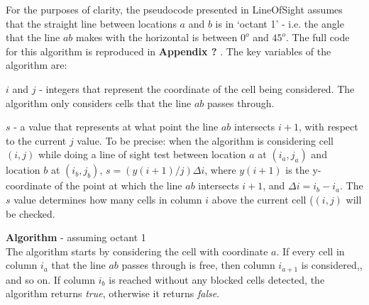 \documentclass[12pt,notitlepage]{report}
\begin{document}
\noindent
For the purposes of clarity, the pseudocode presented in {\sc LineOfSight} assumes that the straight line between locations $a$ and $b$ is in `octant 1' - i.e. the angle that the line $ab$ makes with the horizontal is between $0^{o}$ and $45^{o}$.
The full code for this algorithm is reproduced in {\bfseries Appendix ?} . The key variables of the algorithm are:
\begin{description}
\item{$i$ and $j$} - integers that represent the coordinate of the cell being considered. The algorithm only considers cells that the line $ab$ passes through.
\item{$s$} - a value that represents at what point the line $ab$ intersects $i+1$, with respect to the current $j$ value. To be precise: when the algorithm is considering cell $(i,j)$ while doing a line of sight test between location $a$ at $(i_{a},j_{a})$ and location $b$ at $(i_{b},j_{b})$, $s = (y(i+1)/j)\Delta i$, where $y(i+1)$ is the y-coordinate of the point at which the line $ab$ intersects $i+1$, and $\Delta i = i_{b} - i_{a}$. The $s$ value determines how many cells in column $i$ above the current cell ($(i,j)$ will be checked.
\end{description}

\noindent
{\bfseries Algorithm} - assuming octant 1\\
\noindent
The algorithm starts by considering the cell with coordinate $a$. If every cell in column $i_{a}$ that the line $ab$ passes through is free, then column $i_{a+1}$ is considered,, and so on. If column $i_{b}$ is reached without any blocked cells detected, the algorithm returns {\em true}, otherwise it returns {\em false}.\\
\end{document}
